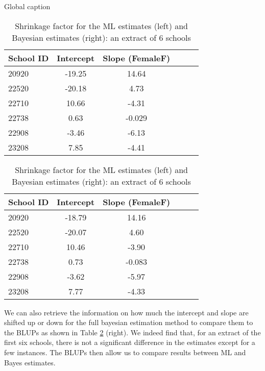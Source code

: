 \begin{table}[!htb]
	\caption{Global caption}
	
	\begin{minipage}{.5\linewidth}
		\caption{}
		\centering
		{
			\begin{tabular}{l | c c c c c}
				School ID & Intercept & Slope (FemaleF)\\
				\hline
				20920 & -19.25 & 14.64 \\
				22520 & -20.18 & 4.73 \\
				22710 & 10.66 & -4.31 \\
				22738  & 0.63 & -0.029 \\
				22908 & -3.46 & -6.13 \\
				23208 & 7.85 & -4.41
			\end{tabular}
		}
	\end{minipage}%
	\begin{minipage}{.5\linewidth}
		\centering
		\caption{}
		{
			\begin{tabular}{l | c c c c c}
				School ID & Intercept & Slope (FemaleF)\\
				\hline
				20920 & -18.79 & 14.16 \\
				22520 & -20.07 & 4.60 \\
				22710  & 10.46 & -3.90 \\
				22738  & 0.73 & -0.083  \\
				22908 & -3.62 & -5.97 \\
				23208  & 7.77 & -4.33
			\end{tabular}
		}
		
	\end{minipage}
	\caption{{\small Shrinkage factor for the ML estimates (left) and Bayesian estimates (right): an extract of 6 schools}}
	\label{tab:shrinkage}
\end{table}

We can also retrieve the information on how much the intercept and slope are shifted up or down for the full bayesian estimation method to compare them to the BLUPs as shown in Table \ref{tab:shrinkage} (right). We indeed find that, for an extract of the first six schools, there is not a significant difference in the estimates except for a few instances. The BLUPs then allow us to compare results between ML and Bayes estimates.

